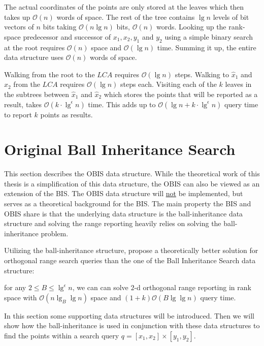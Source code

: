 The actual coordinates of the points are only stored at the leaves which then takes up $\mathcal{O}(n)$  words of space. The rest of the tree contains $\lg n$ levels of bit vectors of $n$ bits taking $\mathcal{O}(n \lg n)$ bits, $\mathcal{O}(n)$ words. Looking up the rank-space predecessor and successor of $x_1, x_2, y_1$ and $y_2$ using a simple binary search at the root requires $\mathcal{O}(n)$ space and $\mathcal{O}(\lg n)$ time. Summing it up, the entire data structure uses $\mathcal{O}(n)$ words of space. 

Walking from the root to the $LCA$ requires $\mathcal{O}(\lg n)$ steps. Walking to $\hat{x}_1$ and $\hat{x}_2$ from the $LCA$ requires $\mathcal{O}(\lg n)$ steps each. Visiting each of the $k$ leaves in the subtrees between $\hat{x}_1$ and $\hat{x}_2$ which stores the points that will be reported as a result, takes $\mathcal{O}(k \cdot \lg^\epsilon n)$ time.  This adds up to $\mathcal{O}(\lg n + k\cdot\lg^\epsilon n)$ query time to report $k$ points as results.


\section{Original Ball Inheritance Search}
\label{sect:original}

This section describes the OBIS data structure. While the theoretical work of this thesis is a simplification of this data structure, the OBIS can also be viewed as an extension of the BIS. The OBIS data structure will \underline{not} be implemented, but serves as a theoretical background for the BIS. The main property the BIS and OBIS share is that the underlying data structure is the ball-inheritance data structure and solving the range reporting heavily relies on solving the ball-inheritance problem.

Utilizing the ball-inheritance structure, \citet{chanetal} propose a theoretically better solution for orthogonal range search queries than the one of the Ball Inheritance Search data structure: 
\begin{customthm}{2.1}\label{theorem21}
for any $2 \leq B \leq \lg^\epsilon n$, we can can solve $2$-d orthogonal range reporting in rank space with $\mathcal{O}(n \lg_B \lg n)$ space and $(1+k)\mathcal{O}(B \lg \lg n)$ query time.
\end{customthm}

In this section some supporting data structures will be introduced. Then we will show how the ball-inheritance is used in conjunction with these data structures to find the points within a search query $q = [x_1, x_2] \times [y_1, y_2]$.


